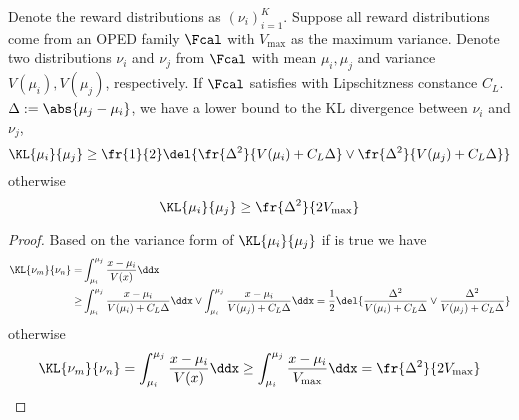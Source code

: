     
\begin{lemma} \label{lemma:lip-exp-KL-lower-bound}
    Denote the reward distributions as $(\nu_i)_{i=1}^K$. 
    Suppose all reward distributions come from an OPED family $\Fcal$ with $V_{\max}$ as the maximum variance.
    Denote two distributions $\nu_i$ and $\nu_j$ from $\Fcal$ with mean $\mu_i, \mu_j$ and variance $V(\mu_i), V(\mu_j)$, respectively.
    If $\Fcal$ satisfies  with Lipschitzness constance $C_L$.
    $\Delta:= \abs{\mu_j - \mu_i}$, we have a lower bound to the KL divergence between $\nu_i$ and $\nu_j$, 
    \[
        \KL{\mu_i}{\mu_j}
        \geq
        \fr{1}{2} \del{
            \fr{\Delta^2}{V(\mu_i) + C_L \Delta} \vee
            \fr{\Delta^2}{V(\mu_j) + C_L \Delta}}
    \]
    otherwise
    \[
        \KL{\mu_i}{\mu_j}
        \geq
        \fr{\Delta^2}{2V_{\max}}
    \]
    \end{lemma}
    
    \begin{proof}
        Based on the variance form of $\KL{\mu_i}{\mu_j}$ if  is true we have
        \begin{align*}
            \KL{\nu_m}{\nu_n}
            =&
            \int_{\mu_i}^{\mu_j} \frac{x-\mu_i}{V(x)} \ddx
            \\
            \ge&
            \int_{\mu_i}^{\mu_j} \frac{x-\mu_i}{V(\mu_i) + C_L\Delta} \ddx \vee
            \int_{\mu_i}^{\mu_j} \frac{x-\mu_i}{V(\mu_j) + C_L\Delta} \ddx 
            =
            \frac{1}{2} \del{ 
            \frac{\Delta^2}{V(\mu_i) + C_L\Delta} \vee \frac{\Delta^2}{V(\mu_j) + C_L\Delta}}
        \end{align*}
        otherwise
        \begin{align*}
            \KL{\nu_m}{\nu_n}
            =
            \int_{\mu_i}^{\mu_j} \frac{x-\mu_i}{V(x)} \ddx
            \ge
            \int_{\mu_i}^{\mu_j} \frac{x-\mu_i}{V_{\max}} \ddx
            =
            \fr{\Delta^2}{2V_{\max}}
        \end{align*}
    \end{proof}


